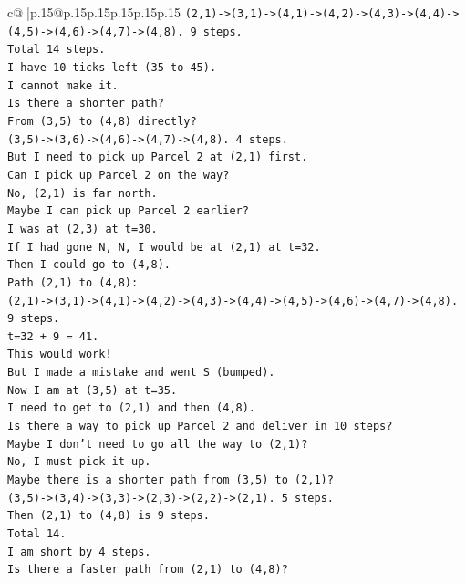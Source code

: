 \documentclass{article}
\begin{document}
{\begin{supertabular}{c@{$\;$}|p{.15\linewidth}@{}p{.15\linewidth}p{.15\linewidth}p{.15\linewidth}p{.15\linewidth}p{.15\linewidth}}
{{{\texttt{(2,1){-}>(3,1){-}>(4,1){-}>(4,2){-}>(4,3){-}>(4,4){-}>(4,5){-}>(4,6){-}>(4,7){-}>(4,8). 9 steps.} \\
\texttt{Total 14 steps.} \\
\texttt{I have 10 ticks left (35 to 45).} \\
\texttt{I cannot make it.} \\
\texttt{Is there a shorter path?} \\
\texttt{From (3,5) to (4,8) directly?} \\
\texttt{(3,5){-}>(3,6){-}>(4,6){-}>(4,7){-}>(4,8). 4 steps.} \\
\texttt{But I need to pick up Parcel 2 at (2,1) first.} \\
\texttt{Can I pick up Parcel 2 on the way?} \\
\texttt{No, (2,1) is far north.} \\
\texttt{Maybe I can pick up Parcel 2 earlier?} \\
\texttt{I was at (2,3) at t=30.} \\
\texttt{If I had gone N, N, I would be at (2,1) at t=32.} \\
\texttt{Then I could go to (4,8).} \\
\texttt{Path (2,1) to (4,8):} \\
\texttt{(2,1){-}>(3,1){-}>(4,1){-}>(4,2){-}>(4,3){-}>(4,4){-}>(4,5){-}>(4,6){-}>(4,7){-}>(4,8). 9 steps.} \\
\texttt{t=32 + 9 = 41.} \\
\texttt{This would work!} \\
\texttt{But I made a mistake and went S (bumped).} \\
\texttt{Now I am at (3,5) at t=35.} \\
\texttt{I need to get to (2,1) and then (4,8).} \\
\texttt{Is there a way to pick up Parcel 2 and deliver in 10 steps?} \\
\texttt{Maybe I don't need to go all the way to (2,1)?} \\
\texttt{No, I must pick it up.} \\
\texttt{Maybe there is a shorter path from (3,5) to (2,1)?} \\
\texttt{(3,5){-}>(3,4){-}>(3,3){-}>(2,3){-}>(2,2){-}>(2,1). 5 steps.} \\
\texttt{Then (2,1) to (4,8) is 9 steps.} \\
\texttt{Total 14.} \\
\texttt{I am short by 4 steps.} \\
\texttt{Is there a faster path from (2,1) to (4,8)?} \\
}}}
\end{supertabular}}
\end{document}
